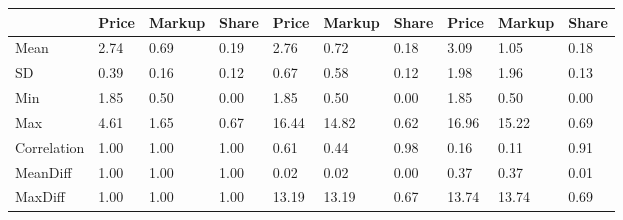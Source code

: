 \begin{table}[htbp]
\begin{tabular}{llllllllll} \hline \hline
 & Price  & Markup  & Share  & Price  & Markup  & Share  & Price  & Markup  & Share  \\  \hline 
Mean &      2.74 &      0.69 &      0.19 &      2.76 &      0.72 &      0.18 &      3.09 &      1.05 &      0.18 \\  
SD &      0.39 &      0.16 &      0.12 &      0.67 &      0.58 &      0.12 &      1.98 &      1.96 &      0.13 \\  
Min &      1.85 &      0.50 &      0.00 &      1.85 &      0.50 &      0.00 &      1.85 &      0.50 &      0.00 \\  
Max &      4.61 &      1.65 &      0.67 &     16.44 &     14.82 &      0.62 &     16.96 &     15.22 &      0.69 \\  
Correlation &      1.00 &      1.00 &      1.00 &      0.61 &      0.44 &      0.98 &      0.16 &      0.11 &      0.91 \\  
MeanDiff &      1.00 &      1.00 &      1.00 &      0.02 &      0.02 &      0.00 &      0.37 &      0.37 &      0.01 \\  
MaxDiff &      1.00 &      1.00 &      1.00 &     13.19 &     13.19 &      0.67 &     13.74 &     13.74 &      0.69 \\  
\hline \hline \end{tabular}
\end{table}
